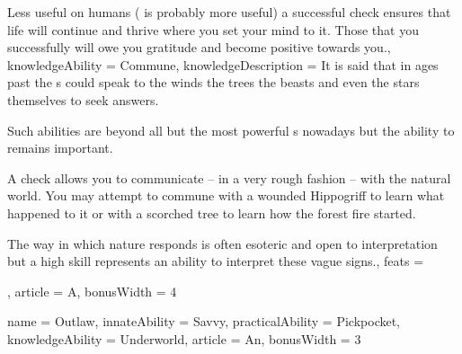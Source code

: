 {Less useful on humans ( is probably more useful)\comma{} a successful  check ensures that life will continue and thrive where you set your mind to it. Those that you successfully  will owe you gratitude and become positive towards you.,
	knowledgeAbility = Commune,
	knowledgeDescription = It is said that\comma{} in ages past\comma{} the \bname{}s could speak to the winds\comma{} the trees\comma{} the beasts and even the stars themselves to seek answers. 

Such abilities are beyond all but the most powerful \bname{}s nowadays\comma{} but the ability to  remains important. 

A  check allows you to communicate – in a very rough fashion – with the natural world. You may attempt to commune with a wounded Hippogriff to learn what happened to it\comma{} or with a scorched tree to learn how the forest fire started. 

The way in which nature responds is often esoteric and open to interpretation\comma{} but a high  skill represents an ability to interpret these vague signs.,
	feats = 





,
	article = A,
	bonusWidth = 4
}

\archetype
{
	name = Outlaw,
	innateAbility = Savvy,
	practicalAbility = Pickpocket,
	knowledgeAbility = Underworld,
	article = An,
	bonusWidth = 3
}

